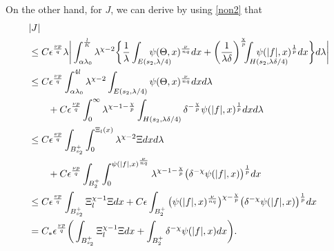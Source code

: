 \documentclass[11pt, reqno]{amsart}
\numberwithin{equation}{section}
\begin{document}
On the other hand, for $J$, we can derive by using \eqref{non2} that
\begin{align*}
&|J|
\\ & \le C \epsilon^{\frac{\nu p}{q}} \lambda
\bigg| \int_{\alpha \lambda_{0}}^{\frac{l}{K}} \lambda^{\chi-2} \bigg\{
\frac{1}{\lambda} \int_{E(s_{2},\lambda/4)}\hspace{-2.5em}\psi(\Theta, x)^{\frac{\nu}{nq}} dx +
 \bigg( \frac{1}{\lambda\delta}\bigg)^{\frac{\chi}{p}}\hspace{-0.5em}
\int_{H(s_{2},\lambda\delta/4)}\hspace{-3.5em}\psi(|f|, x)^{\frac{1}{p}} dx
\bigg\}d\lambda \bigg|
\\ &  \le C \epsilon^{\frac{\nu p}{q}} \int_{\alpha \lambda_{0}}^{4l} \lambda^{\chi-2}  \int_{E(s_{2},\lambda/4)} \psi(\Theta, x)^{\frac{\nu}{nq}} dxd\lambda 
\\ & \qquad + C\epsilon^{\frac{\nu p}{q}} \int_{0}^{\infty} \lambda^{\chi-1-\frac{\chi}{p}}
\int_{H(s_{2},\lambda\delta/4)}\delta^{-\frac{\chi}{p}}\psi(|f|, x)^{\frac{1}{p}} dxd\lambda \\ &
\le  C \epsilon^{\frac{\nu p}{q}} \int_{B_{s_{2}}^{+}} \int_{0}^{\Xi_{l}(x)} \lambda^{\chi-2}\Xi dx d\lambda
\\ & \qquad +  C \epsilon^{\frac{\nu p}{q}} \int_{B_{2}^{+}} \int_{0}^{\psi(|f|, x)^{\frac{\nu}{nq}}} \lambda^{\chi-1-\frac{\chi}{p}}
\big( \delta^{-\chi}  \psi(|f|,x)\big)^{\frac{1}{p}} dx
\\ & \le C\epsilon^{\frac{\nu p}{q}} \int_{B_{s_{2}}^{+}}  \Xi_{l}^{\chi-1}\Xi dx + C\epsilon
\int_{B_{2}^{+}} \big( \psi(|f|,x)^{\frac{\nu}{nq}}\big)^{\chi-\frac{\chi}{p}} \big( \delta^{-\chi}  \psi(|f|,x)\big)^{\frac{1}{p}} dx
\\ & = C_{\ast} \epsilon^{\frac{\nu p}{q}} \bigg(  \int_{B_{s_{2}}^{+}}\Xi_{l}^{\chi-1}\Xi dx +
 \int_{B_{2}^{+}}  \delta^{-\chi}  \psi(|f|,x) dx \bigg).
\end{align*}
\end{document}
